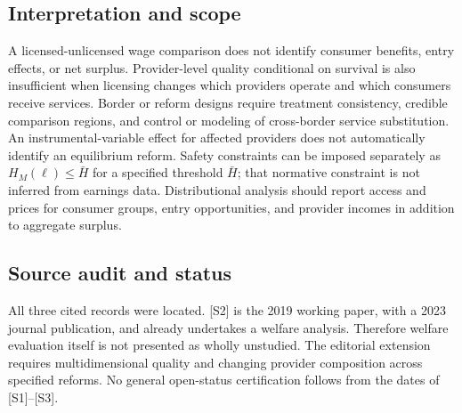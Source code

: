 \documentclass[11pt,a4paper]{article}
\begin{document}
\subsection*{Interpretation and scope}
A licensed-unlicensed wage comparison does not identify consumer benefits, entry effects, or net surplus. Provider-level quality conditional on survival is also insufficient when licensing changes which providers operate and which consumers receive services. Border or reform designs require treatment consistency, credible comparison regions, and control or modeling of cross-border service substitution. An instrumental-variable effect for affected providers does not automatically identify an equilibrium reform. Safety constraints can be imposed separately as $H_M(\ell)\leq\bar H$ for a specified threshold $\bar H$; that normative constraint is not inferred from earnings data. Distributional analysis should report access and prices for consumer groups, entry opportunities, and provider incomes in addition to aggregate surplus.
\subsection*{Source audit and status}
All three cited records were located. [S2] is the 2019 working paper, with a 2023 journal publication, and already undertakes a welfare analysis. Therefore welfare evaluation itself is not presented as wholly unstudied. The editorial extension requires multidimensional quality and changing provider composition across specified reforms. No general open-status certification follows from the dates of [S1]--[S3].
\end{document}
